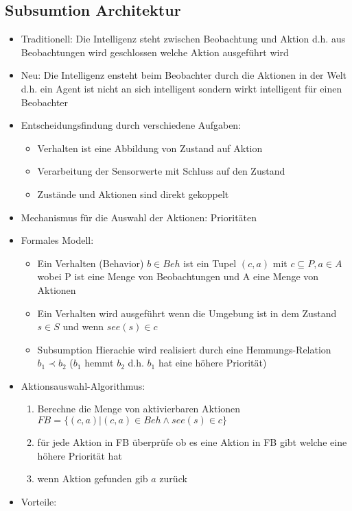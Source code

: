 \documentclass{article} %
\begin{document}
	\subsection{Subsumtion Architektur}
	\begin{itemize}
		\item Traditionell: Die Intelligenz steht zwischen Beobachtung und Aktion d.h. aus Beobachtungen wird geschlossen welche Aktion ausgeführt wird
		\item Neu: Die Intelligenz ensteht beim Beobachter durch die Aktionen in der Welt d.h. ein Agent ist nicht an sich intelligent sondern wirkt intelligent für einen Beobachter
		\item Entscheidungsfindung durch verschiedene Aufgaben:
		\begin{itemize}
			\item Verhalten ist eine Abbildung von Zustand auf Aktion
			\item Verarbeitung der Sensorwerte mit Schluss auf den Zustand
			\item Zustände und Aktionen sind direkt gekoppelt
		\end{itemize}
		\item Mechanismus für die Auswahl der Aktionen: Prioritäten
		\item Formales Modell:
		\begin{itemize}
			\item Ein Verhalten (Behavior) $b \in Beh$ ist ein Tupel $(c,a)$ mit $c \subseteq P, a \in A$ wobei P ist eine Menge von Beobachtungen und A eine Menge von Aktionen
			\item Ein Verhalten wird ausgeführt wenn die Umgebung ist in dem Zustand $s\in S$ und wenn $see(s) \in c$
			\item Subsumption Hierachie wird realisiert durch eine Hemmungs-Relation $b_{1} \prec b_{2}$ ($b_{1}$ hemmt $b_{2}$ d.h. $b_{1}$ hat eine höhere Priorität)
		\end{itemize}
		\item Aktionsauswahl-Algorithmus:
		\begin{enumerate}
			\item Berechne die Menge von aktivierbaren Aktionen $FB = \{(c,a)|(c,a)\in Beh \wedge see(s)\in c\}$
			\item für jede Aktion in FB überprüfe ob es eine Aktion in FB gibt welche eine höhere Priorität hat
			\item wenn Aktion gefunden gib $a$ zurück
		\end{enumerate}
		\item Vorteile:

\end{itemize}
\end{document}
